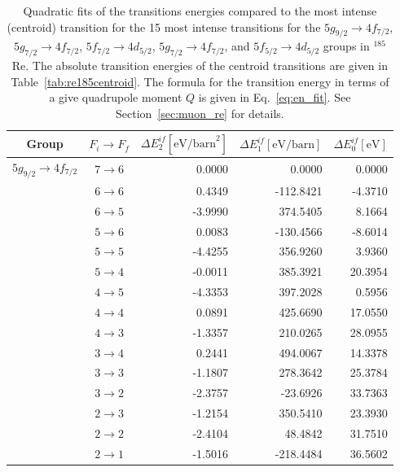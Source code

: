 \begin{table}[b]
\caption{\label{tab:re185energ}%
Quadratic fits of the transitions energies compared to the most intense (centroid) transition for the 15 most intense transitions for the $5g_{9/2}\rightarrow4f_{7/2}$, $5g_{7/2}\rightarrow4f_{7/2}$, $5f_{7/2}\rightarrow4d_{5/2}$, $5g_{7/2}\rightarrow4f_{7/2}$, and $5f_{5/2}\rightarrow4d_{5/2}$ groups in $^{185}$Re. The absolute transition energies of the centroid transitions are given in Table~\ref{tab:re185centroid}. The formula for the transition energy in terms of a give quadrupole moment $Q$ is given in Eq.~\eqref{eq:en_fit}. See Section~\ref{sec:muon_re} for details.}
\centering
\begin{tiny}
\begin{tabular}{cc|rrr}
Group& $F_i \rightarrow F_f$ & $\Delta E_2^{if} [\text{eV/barn}^2]$ & $\Delta E_1^{if} [\text{eV/barn}]$ & $\Delta E_0^{if} [\text{eV}]$\\[1pt]\hline%
$5g_{9/2} \rightarrow 4f_{7/2}$ & $7 \rightarrow 6$ & 0.0000 & 0.0000 & 0.0000 \\
& $6 \rightarrow 6$ & 0.4349 & -112.8421 & -4.3710 \\
& $6 \rightarrow 5$ & -3.9990 & 374.5405 & 8.1664 \\
& $5 \rightarrow 6$ & 0.0083 & -130.4566 & -8.6014 \\
& $5 \rightarrow 5$ & -4.4255 & 356.9260 & 3.9360 \\
& $5 \rightarrow 4$ & -0.0011 & 385.3921 & 20.3954 \\
& $4 \rightarrow 5$ & -4.3353 & 397.2028 & 0.5956 \\
& $4 \rightarrow 4$ & 0.0891 & 425.6690 & 17.0550 \\
& $4 \rightarrow 3$ & -1.3357 & 210.0265 & 28.0955 \\
& $3 \rightarrow 4$ & 0.2441 & 494.0067 & 14.3378 \\
& $3 \rightarrow 3$ & -1.1807 & 278.3642 & 25.3784 \\
& $3 \rightarrow 2$ & -2.3757 & -23.6926 & 33.7363 \\
& $2 \rightarrow 3$ & -1.2154 & 350.5410 & 23.3930 \\
& $2 \rightarrow 2$ & -2.4104 & 48.4842 & 31.7510 \\
& $2 \rightarrow 1$ & -1.5016 & -218.4484 & 36.5602 \\[7pt]


\end{tabular}
\end{tiny}
\end{table}
